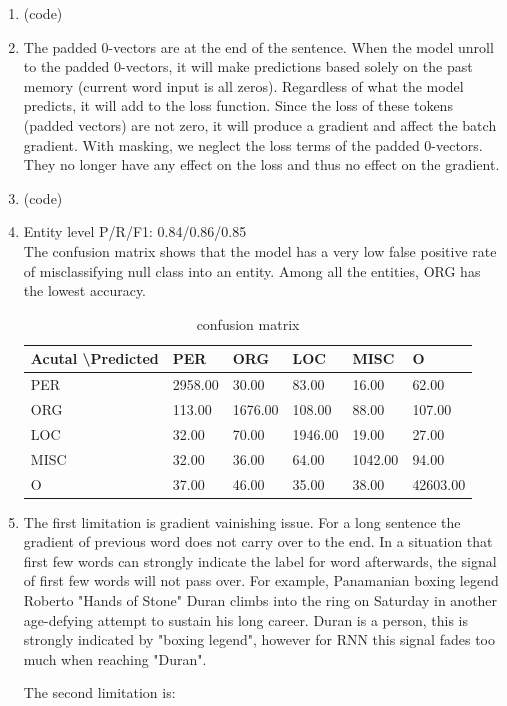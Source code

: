 \documentclass[10pt]{article}
\begin{document}
\begin{enumerate}[label=(\alph*)]
\item
(code)

\item
The padded 0-vectors are at the end of the sentence.
When the model unroll to the padded 0-vectors, it will make predictions based solely on the past memory (current word input is all zeros).
Regardless of what the model predicts, it will add to the loss function.
Since the loss of these tokens (padded vectors) are not zero, it will produce a gradient and affect the batch gradient.
With masking, we neglect the loss terms of the padded 0-vectors. They no longer have any effect on the loss and thus no effect on the gradient.\\

\item
(code)

\item
Entity level P/R/F1: 0.84/0.86/0.85\\
The confusion matrix shows that the model has a very low false positive rate of misclassifying null class into an entity. Among all the entities,  ORG has the lowest accuracy.
\begin{table}[h]
	\centering
	\caption{confusion matrix}
	\begin{tabular}{|l|l|l|l|l|l|}
	\hline
	Acutal \textbackslash Predicted & PER     & ORG     & LOC     & MISC    & O        \\ \hline
	PER   & 2958.00 & 30.00   & 83.00   & 16.00   & 62.00    \\ \hline
	ORG   & 113.00  & 1676.00 & 108.00   & 88.00   & 107.00   \\ \hline
	LOC   & 32.00   & 70.00  & 1946.00 & 19.00   & 27.00    \\ \hline
	MISC  & 32.00   & 36.00   & 64.00   & 1042.00 & 94.00   \\ \hline
	O     & 37.00   & 46.00   & 35.00   & 38.00   & 42603.00 \\ \hline
	\end{tabular}
\end{table}

\item
The first limitation is gradient vainishing issue. For a long sentence the gradient of previous word does not carry over to the end.
In a situation that first few words can strongly indicate the label for word afterwards, the signal of first few words will not pass over.
For example, Panamanian boxing legend Roberto "Hands of Stone" Duran climbs into the ring on Saturday in another age-defying attempt to sustain his long career.
Duran is a person, this is strongly indicated by "boxing legend", however for RNN this signal fades too much when reaching "Duran".

The second limitation is:

\end{enumerate}
\clearpage
\end{document}
